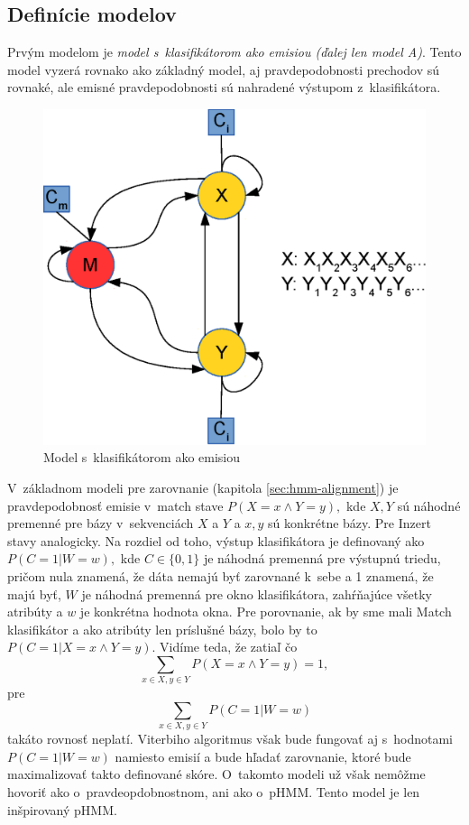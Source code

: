 \subsection{Definície modelov}

Prvým modelom je \textit{model s~klasifikátorom ako emisiou (ďalej len model A)}. Tento model vyzerá rovnako ako základný model, aj pravdepodobnosti prechodov sú rovnaké, ale emisné pravdepodobnosti sú nahradené výstupom z~klasifikátora.
\begin{figure}[htp]
    \centering
    \includegraphics[width=.5\textwidth]{images/model_clf}
    \caption{Model s~klasifikátorom ako emisiou}
\end{figure}

V~základnom modeli pre zarovnanie (kapitola \ref{sec:hmm-alignment}) je pravdepodobnosť emisie v~match stave $P(X=x \wedge Y=y),$ kde $X, Y$ sú náhodné premenné pre bázy v~sekvenciách $X$ a $Y$ a $x, y$ sú konkrétne bázy. Pre Inzert stavy analogicky.
Na rozdiel od toho, výstup klasifikátora je definovaný ako $P(C=1 | W=w),$ kde $C \in \{0,1\}$ je náhodná premenná pre výstupnú triedu, pričom nula znamená, že dáta nemajú byť zarovnané k~sebe a 1 znamená, že majú byť, $W$ je náhodná premenná pre okno klasifikátora, zahŕňajúce všetky atribúty a $w$ je konkrétna hodnota okna.
Pre porovnanie, ak by sme mali Match klasifikátor a ako atribúty len príslušné bázy, bolo by to $P(C=1 | X=x \wedge Y=y)$. Vidíme teda, že zatiaľ čo
$$\sum_{x \in X, y \in Y} P(X=x \wedge Y=y) = 1,$$
pre
$$\sum_{x \in X, y \in Y} P(C=1| W=w)$$
takáto rovnosť neplatí.
Viterbiho algoritmus však bude fungovať aj s~hodnotami $P(C=1| W=w)$ namiesto emisií a bude hľadať zarovnanie, ktoré bude maximalizovať takto definované skóre.
O~takomto modeli už však nemôžme hovoriť ako o~pravdeopdobnostnom, ani ako o~pHMM. Tento model je len inšpirovaný pHMM.

